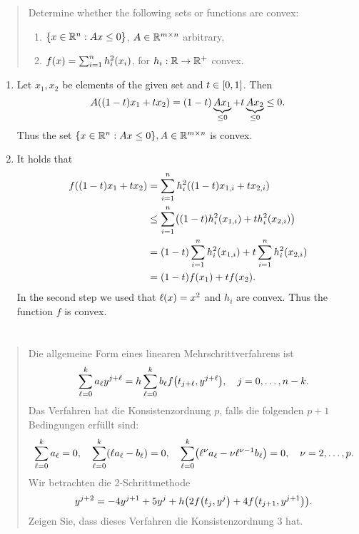 \documentclass{exercise}
\begin{document}
	\begin{quote}
		Determine whether the following sets or functions are convex:
		\begin{enumerate}
			\item \(\braces*{x \in \R^n : Ax \le 0}\), \(A \in \R^{m \times n}\) arbitrary,
			\item \(f\parentheses*{x} = \sum_{i = 1}^n h_i^2\parentheses*{x_i}\), for \(h_i: \R \to \R^+\) convex. 
		\end{enumerate}
	\end{quote}

	\begin{enumerate}
		\item Let \(x_1, x_2\) be elements of the given set and \(t \in \brackets*{0, 1}\).
		Then
		\[
			A\parentheses*{\parentheses*{1 - t}x_1 + tx_2} = \parentheses*{1 - t}\underbrace{Ax_1}_{\le 0} + t\underbrace{Ax_2}_{\le 0} \le 0.
		\]
		Thus the set \(\braces*{x \in \R^n : Ax \le 0}, A \in \R^{m \times n}\) is convex.
		\item It holds that
		\begin{align*}
			f\parentheses*{\parentheses*{1 - t}x_1 + tx_2} &= \sum_{i = 1}^n h_i^2\parentheses*{\parentheses*{1 - t}x_{1, i} + tx_{2, i}}\\
			&\le \sum_{i = 1}^n \parentheses*{\parentheses*{1 - t}h_i^2\parentheses*{x_{1, i}} + th_i^2\parentheses*{x_{2, i}}}\\
			&= \parentheses*{1 - t}\sum_{i = 1}^n h_i^2\parentheses*{x_{1, i}} + t\sum_{i = 1}^n h_i^2\parentheses*{x_{2, i}}\\
			&= \parentheses*{1 - t}f\parentheses*{x_1} + tf\parentheses*{x_2}.
		\end{align*}
		In the second step we used that \(\ell\parentheses*{x} = x^2\) and \(h_i\) are convex.
		Thus the function \(f\) is convex.
	\end{enumerate}


	\section{}

	\begin{quote}
		Die allgemeine Form eines linearen Mehrschrittverfahrens ist
		\[
			\sum_{\ell = 0}^k a_\ell y^{j + \ell} = h\sum_{\ell = 0}^k b_\ell f\parentheses*{t_{j + \ell}, y^{j + \ell}}, \quad j = 0, \ldots, n - k.
		\]
		Das Verfahren hat die Konsistenzordnung \(p\), falls die folgenden \(p + 1\) Bedingungen erfüllt sind:
		\[
			\sum_{\ell = 0}^k a_\ell = 0, \quad \sum_{\ell = 0}^k \parentheses*{\ell a_\ell - b_\ell} = 0, \quad \sum_{\ell = 0}^k \parentheses*{\ell^\nu a_\ell - \nu\ell^{\nu - 1}b_\ell} = 0, \quad \nu = 2, \ldots, p.
		\]
		Wir betrachten die 2-Schrittmethode
		\[
			y^{j + 2} = -4y^{j + 1} + 5y^j + h\parentheses*{2f\parentheses*{t_j, y^j} + 4f\parentheses*{t_{j + 1}, y^{j + 1}}}.
		\]
		Zeigen Sie, dass dieses Verfahren die Konsistenzordnung \(3\) hat.
	\end{quote}
\end{document}
